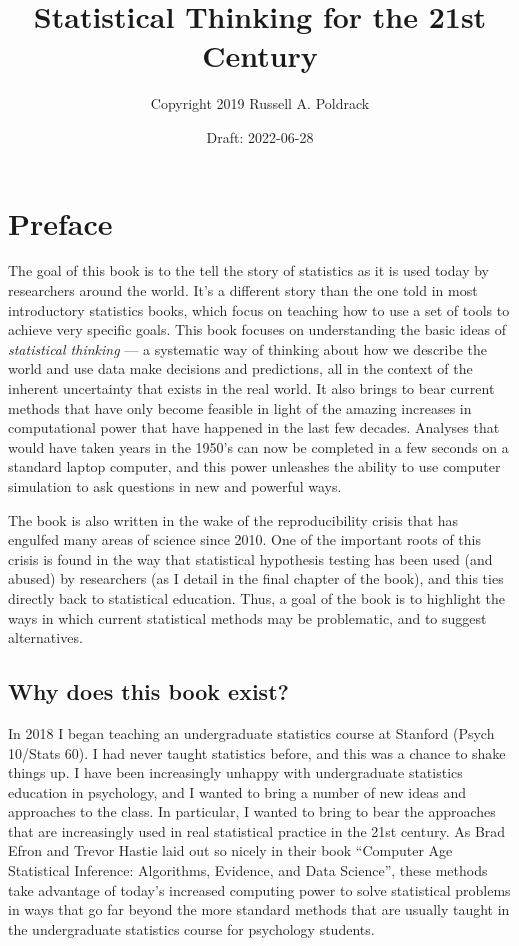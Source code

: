 \documentclass[
  12pt,
]{book}
\title{Statistical Thinking for the 21st Century}
\author{Copyright 2019 Russell A. Poldrack}
\date{Draft: 2022-06-28}
\begin{document}
\maketitle

{
\setcounter{tocdepth}{1}
\tableofcontents
}
\hypertarget{preface}{%
\chapter*{Preface}\label{preface}}

The goal of this book is to the tell the story of statistics as it is used today by researchers around the world. It's a different story than the one told in most introductory statistics books, which focus on teaching how to use a set of tools to achieve very specific goals. This book focuses on understanding the basic ideas of \emph{statistical thinking} --- a systematic way of thinking about how we describe the world and use data make decisions and predictions, all in the context of the inherent uncertainty that exists in the real world. It also brings to bear current methods that have only become feasible in light of the amazing increases in computational power that have happened in the last few decades. Analyses that would have taken years in the 1950's can now be completed in a few seconds on a standard laptop computer, and this power unleashes the ability to use computer simulation to ask questions in new and powerful ways.

The book is also written in the wake of the reproducibility crisis that has engulfed many areas of science since 2010. One of the important roots of this crisis is found in the way that statistical hypothesis testing has been used (and abused) by researchers (as I detail in the final chapter of the book), and this ties directly back to statistical education. Thus, a goal of the book is to highlight the ways in which current statistical methods may be problematic, and to suggest alternatives.

\hypertarget{why-does-this-book-exist}{%
\section{Why does this book exist?}\label{why-does-this-book-exist}}

In 2018 I began teaching an undergraduate statistics course at Stanford (Psych 10/Stats 60). I had never taught statistics before, and this was a chance to shake things up. I have been increasingly unhappy with undergraduate statistics education in psychology, and I wanted to bring a number of new ideas and approaches to the class. In particular, I wanted to bring to bear the approaches that are increasingly used in real statistical practice in the 21st century. As Brad Efron and Trevor Hastie laid out so nicely in their book ``Computer Age Statistical Inference: Algorithms, Evidence, and Data Science'', these methods take advantage of today's increased computing power to solve statistical problems in ways that go far beyond the more standard methods that are usually taught in the undergraduate statistics course for psychology students.
\end{document}
